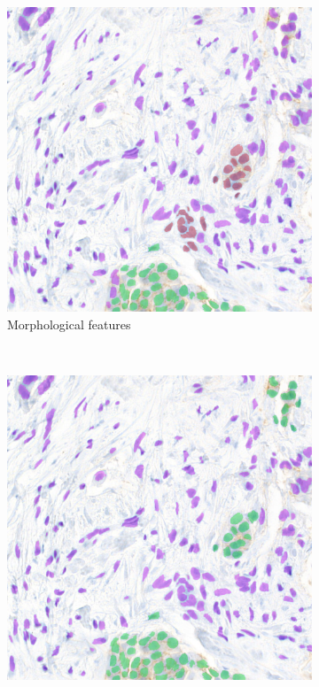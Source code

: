\begin{figure}[H]
\begin{subfigure}[b]{0.45\textwidth}
    \includegraphics[width=\textwidth]{imgs/qual/breast/no-prior1.png}
    \caption{Morphological features}
    \label{fig:breast-no-prior1}
  \end{subfigure}
  \\
  \begin{subfigure}[b]{0.45\textwidth}
    \includegraphics[width=\textwidth]{imgs/qual/breast/no-morph1.png}

\end{subfigure}
\end{figure}
